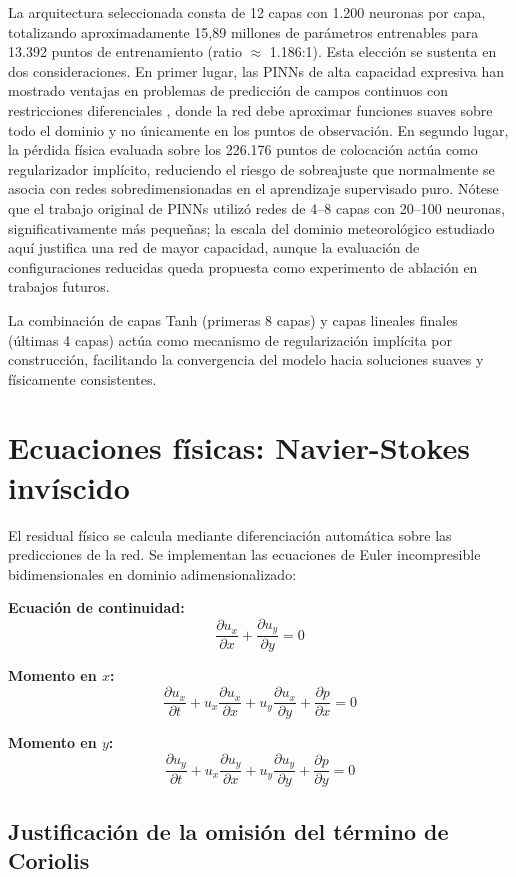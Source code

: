 La arquitectura seleccionada consta de 12 capas con 1.200 neuronas por capa, totalizando aproximadamente 15{,}89 millones de parámetros entrenables para 13.392 puntos de entrenamiento (ratio $\approx$ 1.186:1). Esta elección se sustenta en dos consideraciones. En primer lugar, las PINNs de alta capacidad expresiva han mostrado ventajas en problemas de predicción de campos continuos con restricciones diferenciales \citep{raissi2019physics}, donde la red debe aproximar funciones suaves sobre todo el dominio y no únicamente en los puntos de observación. En segundo lugar, la pérdida física evaluada sobre los 226.176 puntos de colocación actúa como regularizador implícito, reduciendo el riesgo de sobreajuste que normalmente se asocia con redes sobredimensionadas en el aprendizaje supervisado puro. Nótese que el trabajo original de PINNs \citep{raissi2019physics} utilizó redes de 4--8 capas con 20--100 neuronas, significativamente más pequeñas; la escala del dominio meteorológico estudiado aquí justifica una red de mayor capacidad, aunque la evaluación de configuraciones reducidas queda propuesta como experimento de ablación en trabajos futuros.

La combinación de capas Tanh (primeras 8 capas) y capas lineales finales (últimas 4 capas) actúa como mecanismo de regularización implícita por construcción, facilitando la convergencia del modelo hacia soluciones suaves y físicamente consistentes.

\section{Ecuaciones físicas: Navier-Stokes invíscido}

El residual físico se calcula mediante diferenciación automática sobre las predicciones de la red. Se implementan las ecuaciones de Euler incompresible bidimensionales en dominio adimensionalizado:

\textbf{Ecuación de continuidad:}
\[
\frac{\partial u_x}{\partial x} + \frac{\partial u_y}{\partial y} = 0
\]

\textbf{Momento en $x$:}
\[
\frac{\partial u_x}{\partial t} + u_x \frac{\partial u_x}{\partial x} + u_y \frac{\partial u_x}{\partial y} + \frac{\partial p}{\partial x} = 0
\]

\textbf{Momento en $y$:}
\[
\frac{\partial u_y}{\partial t} + u_x \frac{\partial u_y}{\partial x} + u_y \frac{\partial u_y}{\partial y} + \frac{\partial p}{\partial y} = 0
\]
\subsection{Justificación de la omisión del término de Coriolis}

